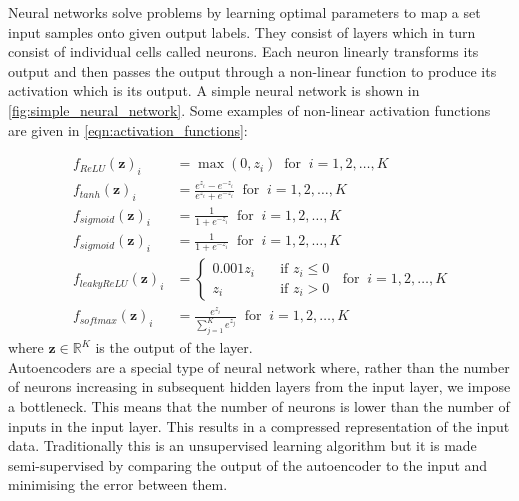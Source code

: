         Neural networks solve problems by learning optimal parameters to map a set input samples onto given output labels. They consist of layers which in turn consist of individual cells called neurons. Each neuron linearly transforms its output and then passes the output through a non-linear function to produce its activation which is its output. A simple neural network is shown in \autoref{fig:simple_neural_network}. Some examples of non-linear activation functions are given in \autoref{eqn:activation_functions}:
        
        \begin{equation}
	    	\label{eqn:activation_functions}
	    	\begin{split}
	    		f_{ReLU}(\boldsymbol{z})_i &= \max(0,z_i) \;\; \text{for} \;\;  i = 1, 2, \dots , K\\
	    		f_{tanh}(\boldsymbol{z})_i &= \frac{e^{z_i}-e^{-z_i}}{e^{z_i}+e^{-z_i}} \;\; \text{for} \;\;  i = 1, 2, \dots , K\\
	    		f_{sigmoid}(\boldsymbol{z})_i &= \frac{1}{1+e^{-z_i}} \;\; \text{for} \;\;  i = 1, 2, \dots , K\\
	    		f_{sigmoid}(\boldsymbol{z})_i &= \frac{1}{1+e^{-z_i}} \;\; \text{for} \;\;  i = 1, 2, \dots , K\\
	    		f_{leakyReLU}(\boldsymbol{z})_i &= 
                \begin{cases}
                    0.001z_i \quad & \text{if $z_i\leq 0$} \\
                    z_i \quad & \text{if $z_i>0$}
                \end{cases}
                 \;\; \text{for} \;\;  i = 1, 2, \dots , K\\
	    		f_{softmax}(\boldsymbol{z})_i &= \frac{e^{z_i}}{\sum_{j=1}^{K}e^{z_j}} \;\; \text{for} \;\;  i = 1, 2, \dots , K
	    	\end{split}
	    \end{equation}
        where $\boldsymbol{z} \in \mathbb{R}^K$ is the output of the layer.
        \\
        
        Autoencoders are a special type of neural network where, rather than the number of neurons increasing in subsequent hidden layers from the input layer, we impose a bottleneck. This means that the number of neurons is lower than the number of inputs in the input layer. This results in a compressed representation of the input data. Traditionally this is an unsupervised learning algorithm but it is made semi-supervised by comparing the output of the autoencoder to the input and minimising the error between them.
        \\
        
